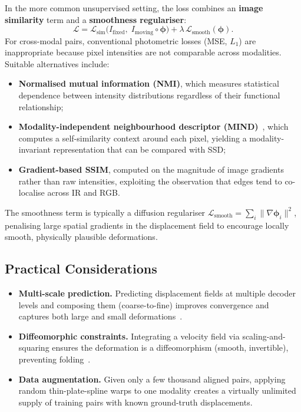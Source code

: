 In the more common unsupervised setting, the loss combines an
\textbf{image similarity} term and a \textbf{smoothness
regulariser}:
\[
    \mathcal{L} = \mathcal{L}_{\text{sim}}\bigl(
        I_{\text{fixed}},\; I_{\text{moving}} \circ
        \boldsymbol{\phi}\bigr)
        + \lambda\,\mathcal{L}_{\text{smooth}}(\boldsymbol{\phi}).
\]
For cross-modal pairs, conventional photometric losses (MSE, $L_1$) are
inappropriate because pixel intensities are not comparable across
modalities.  Suitable alternatives include:
\begin{itemize}
    \item \textbf{Normalised mutual information (NMI)}, which measures
          statistical dependence between intensity distributions
          regardless of their functional relationship;
    \item \textbf{Modality-independent neighbourhood descriptor
          (MIND)}~\cite{heinrich2012mind}, which computes a
          self-similarity context around each pixel, yielding a
          modality-invariant representation that can be compared with
          SSD;
    \item \textbf{Gradient-based SSIM}, computed on the magnitude of
          image gradients rather than raw intensities, exploiting the
          observation that edges tend to co-localise across IR and RGB.
\end{itemize}
The smoothness term is typically a diffusion regulariser
$\mathcal{L}_{\text{smooth}} = \sum_i \|\nabla \boldsymbol{\phi}_i\|^2$,
penalising large spatial gradients in the displacement field to
encourage locally smooth, physically plausible deformations.

\subsection{Practical Considerations}

\begin{itemize}
    \item \textbf{Multi-scale prediction.}  Predicting displacement
          fields at multiple decoder levels and composing them
          (coarse-to-fine) improves convergence and captures both large
          and small deformations~\cite{zhao2019recursive}.
    \item \textbf{Diffeomorphic constraints.}  Integrating a velocity
          field via scaling-and-squaring ensures the deformation is a
          diffeomorphism (smooth, invertible), preventing
          folding~\cite{dalca2019unsupervised}.
    \item \textbf{Data augmentation.}  Given only a few thousand aligned
          pairs, applying random thin-plate-spline warps to one modality
          creates a virtually unlimited supply of training pairs with
          known ground-truth displacements.
\end{itemize}

